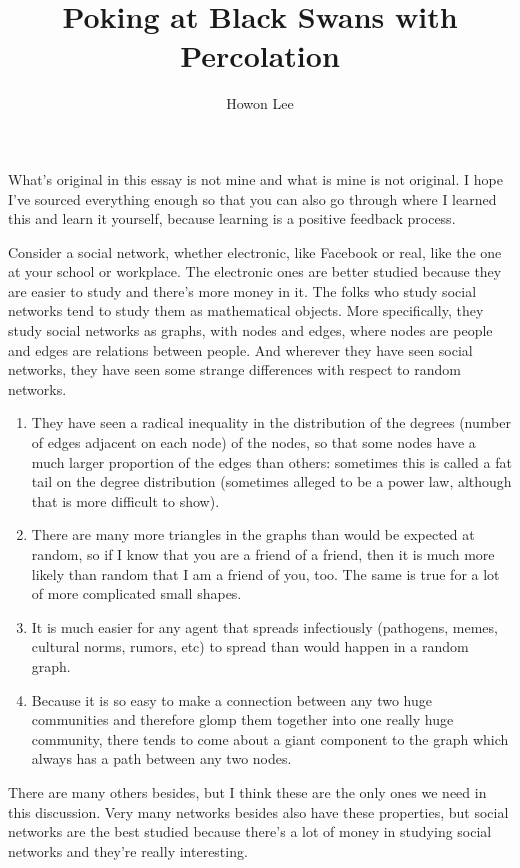 \documentclass[12pt]{article}
\begin{document}
\title{Poking at Black Swans with Percolation}
\author{Howon Lee}
\maketitle

What's original in this essay is not mine and what is mine is not original. I hope I've sourced everything enough so that you can also go through where I learned this and learn it yourself, because learning is a positive feedback process.

Consider a social network, whether electronic, like Facebook or real, like the one at your school or workplace. The electronic ones are better studied because they are easier to study and there's more money in it. The folks who study social networks tend to study them as mathematical objects. More specifically, they study social networks as graphs, with nodes and edges, where nodes are people and edges are relations between people. And wherever they have seen social networks, they have seen some strange differences with respect to random networks.

\begin{enumerate}
  \item They have seen a radical inequality in the distribution of the degrees (number of edges adjacent on each node) of the nodes, so that some nodes have a much larger proportion of the edges than others: sometimes this is called a fat tail on the degree distribution (sometimes alleged to be a power law, although that is more difficult to show).
  \item There are many more triangles in the graphs than would be expected at random, so if I know that you are a friend of a friend, then it is much more likely than random that I am a friend of you, too. The same is true for a lot of more complicated small shapes.
  \item It is much easier for any agent that spreads infectiously (pathogens, memes, cultural norms, rumors, etc) to spread than would happen in a random graph.
  \item Because it is so easy to make a connection between any two huge communities and therefore glomp them together into one really huge community, there tends to come about a giant component to the graph which always has a path between any two nodes.
\end{enumerate}

There are many others besides, but I think these are the only ones we need in this discussion. Very many networks besides also have these properties, but social networks are the best studied because there's a lot of money in studying social networks and they're really interesting.
\end{document}
